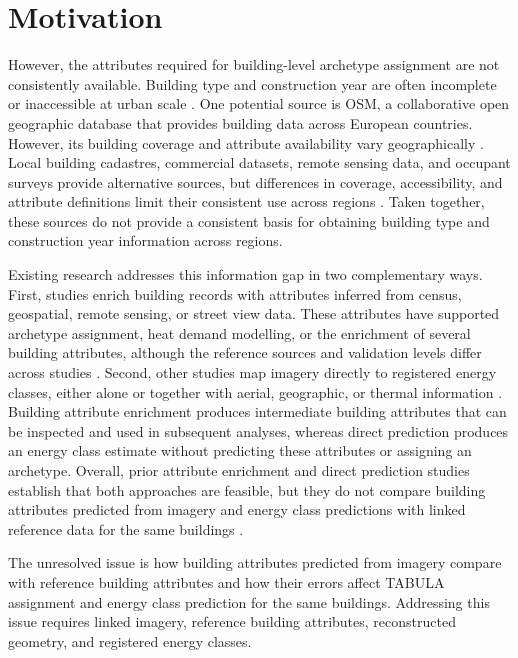 \section{Motivation}
\label{sec:motivation}

However, the attributes required for building-level archetype assignment are not consistently available. Building type and construction year are often incomplete or inaccessible at urban scale \parencite{milojevicdupont2023,dabrock2025}. One potential source is \Ac{OSM}, a collaborative open geographic database that provides building data across European countries. However, its building coverage and attribute availability vary geographically \parencite{milojevicdupont2023}. Local building cadastres, commercial datasets, remote sensing data, and occupant surveys provide alternative sources, but differences in coverage, accessibility, and attribute definitions limit their consistent use across regions \parencite{dabrock2025}. Taken together, these sources do not provide a consistent basis for obtaining building type and construction year information across regions.

Existing research addresses this information gap in two complementary ways. First, studies enrich building records with attributes inferred from census, geospatial, remote sensing, or street view data. These attributes have supported archetype assignment, heat demand modelling, or the enrichment of several building attributes, although the reference sources and validation levels differ across studies \parencite{dabrock2025,wurm2021,liang2025}. Second, other studies map imagery directly to registered energy classes, either alone or together with aerial, geographic, or thermal information \parencite{mayer2023uk,mayer2023dk,liu2025,sun2026,pan_nd}. Building attribute enrichment produces intermediate building attributes that can be inspected and used in subsequent analyses, whereas direct prediction produces an energy class estimate without predicting these attributes or assigning an archetype. Overall, prior attribute enrichment and direct prediction studies establish that both approaches are feasible, but they do not compare building attributes predicted from imagery and energy class predictions with linked reference data for the same buildings \parencite{dabrock2025,wurm2021,liang2025,mayer2023uk,mayer2023dk,liu2025,sun2026,pan_nd}.

The unresolved issue is how building attributes predicted from imagery compare with reference building attributes and how their errors affect \ac{TABULA} assignment and energy class prediction for the same buildings. Addressing this issue requires linked imagery, reference building attributes, reconstructed geometry, and registered energy classes.

